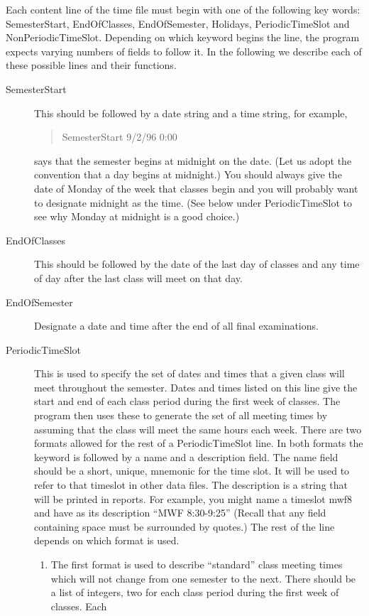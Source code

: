Each content line of the time file must begin with one of the following
key words: SemesterStart, EndOfClasses, EndOfSemester, Holidays, 
PeriodicTimeSlot and NonPeriodicTimeSlot. Depending on which keyword 
begins the line, the program expects varying numbers of fields to follow
it. In the following we describe each of these possible lines and their
functions.
\begin{description}
\item [SemesterStart] This should be followed by a date string and a time
string, for example, 
\begin{quote}
SemesterStart 9/2/96 0:00
\end{quote}
says that the semester begins at midnight on the  date. (Let us adopt the
convention that a day begins at midnight.)
 You should
always give the date of Monday of the  week that classes begin and you will probably
want to designate midnight as the time. (See below under PeriodicTimeSlot
to see why Monday at midnight is a good choice.)
\item [EndOfClasses] This should be followed by the date of the last day
of classes and any time of day after the last class will meet on that day.
\item [EndOfSemester] Designate a date and time after the end of all final
examinations.
\item [PeriodicTimeSlot] This is used to specify the set of dates and times
that a given class will meet throughout the semester. Dates and times listed
on this line give the start and end of each class period during the first
week of classes. The program then uses these to generate the set of all
meeting times by assuming that the class will meet the same hours each week.
There are two formats allowed for the rest of a PeriodicTimeSlot line. In
both formats the keyword is followed by a name and a description field. The
name field should be a short, unique, mnemonic for the time slot. It will
be used to refer to that timeslot in other data files. The description is
a string that will be printed in reports. For example, you might name a
timeslot mwf8 and have as its description ``MWF 8:30-9:25'' (Recall that
any field containing space must be surrounded by quotes.) The rest of the
line depends on which format is used.
\begin{enumerate}
\item  The first format is used to describe ``standard'' class meeting times
which will not change from one semester to the next. There should be a list
of integers, two for each class period during the first week of classes. Each

\end{enumerate}
\end{description}
